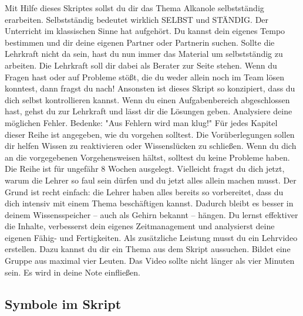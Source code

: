\documentclass{scrartcl}  %
\begin{document}
			Mit Hilfe dieses Skriptes sollst du dir das Thema Alkanole selbstständig erarbeiten. Selbstständig bedeutet wirklich SELBST und STÄNDIG. Der Unterricht im klassischen Sinne hat aufgehört. Du kannst dein eigenes Tempo bestimmen und dir deine eigenen Partner oder Partnerin suchen. Sollte die Lehrkraft nicht da sein, hast du nun immer das Material um selbstständig zu arbeiten.
			Die Lehrkraft soll dir dabei als Berater zur Seite stehen. Wenn du Fragen hast oder auf Probleme stößt, die du weder allein noch im Team lösen konntest, dann fragst du nach!
			Ansonsten ist dieses Skript so konzipiert, dass du dich selbst kontrollieren kannst. Wenn du einen Aufgabenbereich abgeschlossen hast, gehst du zur Lehrkraft und lässt dir die Lösungen geben. Analysiere deine möglichen Fehler. Bedenke: "Aus Fehlern wird man klug!"
			Für jedes Kapitel dieser Reihe ist angegeben, wie du vorgehen solltest. Die Vorüberlegungen sollen dir helfen Wissen zu reaktivieren oder Wissenslücken zu schließen. Wenn du dich an die vorgegebenen Vorgehensweisen hältst, solltest du keine Probleme haben.
			Die Reihe ist für ungefähr 8 Wochen ausgelegt.
			Vielleicht fragst du dich jetzt, warum die Lehrer so faul sein dürfen und du jetzt alles allein machen musst. Der Grund ist recht einfach: die Lehrer haben alles bereits so vorbereitet, dass du dich intensiv mit einem Thema beschäftigen kannst. Dadurch bleibt es besser in deinem Wissensspeicher – auch als Gehirn bekannt – hängen. Du lernst effektiver die Inhalte, verbesserst dein eigenes Zeitmanagement und analysierst deine eigenen Fähig- und Fertigkeiten.
			Als zusätzliche Leistung musst du ein Lehrvideo erstellen. Dazu kannst du dir ein Thema aus dem Skript aussuchen. Bildet eine Gruppe aus maximal vier Leuten. Das Video sollte nicht länger als vier Minuten sein. Es wird in deine Note einfließen.
	
			\subsection{Symbole im Skript}
	
	
\end{document}

